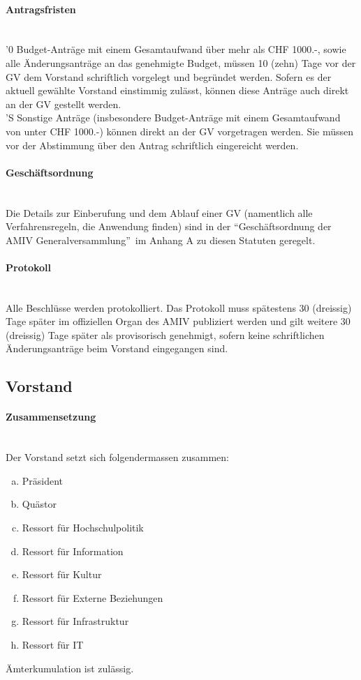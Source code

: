 \documentclass[a4paper,11pt]{article}
\newcommand{\nl}{\\[1.5ex]}
\begin{document}
\paragraph{Antragsfristen}\label{Antragsfristen} \ \\
'0 Budget-Anträge mit einem Gesamtaufwand über mehr als CHF 1000.-, sowie alle Änderungsanträge an das genehmigte Budget, müssen 10 (zehn) Tage vor der GV dem Vorstand schriftlich vorgelegt und begründet werden. Sofern es der aktuell gewählte Vorstand einstimmig zulässt, können diese Anträge auch direkt an der GV gestellt werden. \nl
'S Sonstige Anträge (insbesondere Budget-Anträge mit einem Gesamtaufwand von unter CHF 1000.-) können direkt an der GV vorgetragen werden. Sie müssen vor der Abstimmung über den Antrag schriftlich eingereicht werden.


\paragraph{Geschäftsordnung} \ \\
Die Details zur Einberufung und dem Ablauf einer GV (namentlich alle Verfahrensregeln, die Anwendung finden) sind in der ``Geschäftsordnung der AMIV Generalversammlung''\ im Anhang A zu diesen Statuten geregelt.


\paragraph{Protokoll} \ \\
Alle Beschlüsse werden protokolliert. Das Protokoll muss spätestens 30 (dreissig) Tage später im offiziellen Organ des AMIV publiziert werden und gilt weitere 30 (dreissig) Tage später als provisorisch genehmigt, sofern keine schriftlichen Änderungsanträge beim Vorstand eingegangen sind.


\subsection{Vorstand}
\paragraph{Zusammensetzung} \ \\
Der Vorstand setzt sich folgendermassen zusammen:
\begin{enumerate}[(a)]
  \item Präsident
  \item Quästor
  \item Ressort für Hochschulpolitik
  \item Ressort für Information
  \item Ressort für Kultur
  \item Ressort für Externe Beziehungen
  \item Ressort für Infrastruktur
  \item Ressort für IT
\end{enumerate}
Ämterkumulation ist zulässig.
\end{document}

